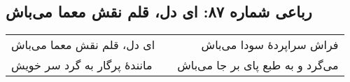 \begin{center}
\section*{رباعی شماره ۸۷: ای دل، قلم نقش معما می‌باش}
\label{sec:087}
\begin{longtable}{l p{0.5cm} r}
ای دل، قلم نقش معما می‌باش
&&
فراش سراپردهٔ سودا می‌باش
\\
مانندهٔ پرگار به گرد سر خویش
&&
می‌گرد و به طبع پای بر جا می‌باش
\\
\end{longtable}
\end{center}

